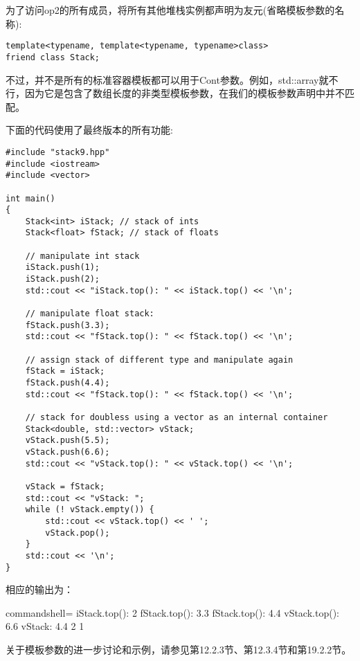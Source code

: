 为了访问op2的所有成员，将所有其他堆栈实例都声明为友元(省略模板参数的名称):

\begin{lstlisting}[style=styleCXX]
template<typename, template<typename, typename>class>
friend class Stack;
\end{lstlisting}

不过，并不是所有的标准容器模板都可以用于Cont参数。例如，std::array就不行，因为它是包含了数组长度的非类型模板参数，在我们的模板参数声明中并不匹配。

下面的代码使用了最终版本的所有功能:

\begin{lstlisting}[style=styleCXX]
#include "stack9.hpp"
#include <iostream>
#include <vector>

int main()
{
	Stack<int> iStack; // stack of ints
	Stack<float> fStack; // stack of floats
	
	// manipulate int stack
	iStack.push(1);
	iStack.push(2);
	std::cout << "iStack.top(): " << iStack.top() << '\n';
	
	// manipulate float stack:
	fStack.push(3.3);
	std::cout << "fStack.top(): " << fStack.top() << '\n';
	
	// assign stack of different type and manipulate again
	fStack = iStack;
	fStack.push(4.4);
	std::cout << "fStack.top(): " << fStack.top() << '\n';
	
	// stack for doubless using a vector as an internal container
	Stack<double, std::vector> vStack;
	vStack.push(5.5);
	vStack.push(6.6);
	std::cout << "vStack.top(): " << vStack.top() << '\n';
	
	vStack = fStack;
	std::cout << "vStack: ";
	while (! vStack.empty()) {
		std::cout << vStack.top() << ' ';
		vStack.pop();
	}
	std::cout << '\n';
}
\end{lstlisting}

相应的输出为：

\begin{tcblisting}{commandshell={}}
iStack.top(): 2
fStack.top(): 3.3
fStack.top(): 4.4
vStack.top(): 6.6
vStack: 4.4 2 1
\end{tcblisting}

关于模板参数的进一步讨论和示例，请参见第12.2.3节、第12.3.4节和第19.2.2节。





















